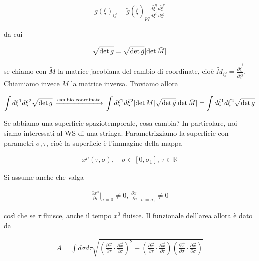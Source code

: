 \documentclass{report}
\begin{document}
\begin{align}
    g(\xi)_{ij} = \tilde{g}(\tilde{\xi})_{pq}\frac{d\tilde{\xi}^q}{d\xi^i}\frac{d\tilde{\xi}^p}{d\xi^j}
\end{align}

da cui 

\begin{align}
    \sqrt{\det g} = \sqrt{\det{\tilde{g}}}\lvert\det \tilde{M}\rvert
\end{align}

se chiamo con \(\tilde{M}\) la matrice jacobiana del cambio di coordinate, cioè \(\tilde{M}_{ij} = \frac{\partial \tilde{\xi}^i}{\partial \xi^j}\). Chiamiamo invece \(M\) la matrice inversa. Troviamo allora 

\begin{align}
    \int d\xi^1 d\xi^2 \sqrt{\det{g}} \, \xrightarrow[]{\text{cambio coordinate}} \, \int d\tilde{\xi}^1 d\tilde{\xi}^2 \lvert\det M\rvert \sqrt{\det \tilde{g}} \lvert\det{\tilde{M}}\rvert = \int d\tilde{\xi}^1 d\tilde{\xi}^2 \sqrt{\det g} 
\end{align}

Se abbiamo una superficie spaziotemporale, cosa cambia? In particolare, noi siamo interessati al WS di una stringa. Parametrizziamo la superficie con parametri \(\sigma, \tau\), cioè la superficie è l'immagine della mappa 

\begin{align}
    x^\mu(\tau, \sigma), \quad \sigma \in [0, \sigma_1], \, \tau \in \mathbb{R}
\end{align}

Si assume anche che valga 

\begin{align}
    \frac{\partial x^0}{\partial \tau}\biggr|_{\sigma = 0 } \neq 0, \,  \frac{\partial x^0}{\partial \tau}\biggr|_{\sigma = \sigma_1} \neq 0
\end{align}

così che se \(\tau\) fluisce, anche il tempo \(x^0\) fluisce. Il funzionale dell'area allora è dato da 

\begin{align}
    A = \int d\sigma d\tau \sqrt{\left(\frac{\partial\vec{x}}{\partial \tau}\cdot \frac{\partial \vec{x}}{\partial \sigma}\right)^2 - \left(\frac{\partial\vec{x}}{\partial \tau}\cdot \frac{\partial \vec{x}}{\partial \tau}\right)\left(\frac{\partial\vec{x}}{\partial \sigma}\cdot \frac{\partial \vec{x}}{\partial \sigma}\right) }
\end{align}
\end{document}
